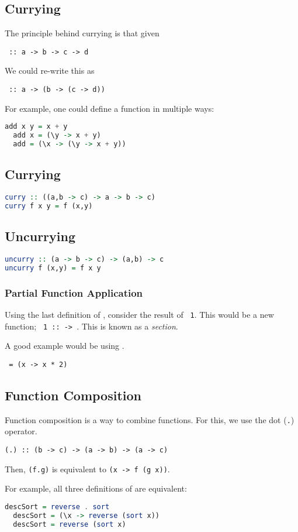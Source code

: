 \subsection{Currying}
The principle behind currying is that given
\begin{center}
  \texttt{ :: a -> b -> c -> d}
\end{center}
We could re-write this as
\begin{center}
  \texttt{ :: a -> (b -> (c -> d))}
\end{center}

For example, one could define a function \texttt{} in multiple ways:
\begin{lstlisting}[language=haskell]
  add x y = x + y
  add x = (\y -> x + y)
  add = (\x -> (\y -> x + y))
\end{lstlisting}

\subsection{Currying}
\begin{lstlisting}[language=haskell]
curry :: ((a,b -> c) -> a -> b -> c)
curry f x y = f (x,y)
\end{lstlisting}

\subsection{Uncurrying}
\begin{lstlisting}[language=haskell]
uncurry :: (a -> b -> c) -> (a,b) -> c
uncurry f (x,y) = f x y
\end{lstlisting}

\subsubsection{Partial Function Application}
Using the last definition of \texttt{}, consider the result of \texttt{ 1}. This would be a new function; \texttt{ 1 ::  -> }. This is known as a \textit{section}.

A good example would be using \texttt{}.
\begin{center}
  \texttt{ =  (x -> x * 2)}
\end{center}

\subsection{Function Composition}
Function composition is a way to combine functions. For this, we use the dot (\texttt{.}) operator.
\begin{center}
  \texttt{(.) :: (b -> c) -> (a -> b) -> (a -> c)}
\end{center}
Then, \texttt{(f.g)} is equivalent to \texttt{(x -> f (g x))}.

For example, all three definitions of \texttt{} are equivalent:
\begin{lstlisting}[language=haskell]
  descSort = reverse . sort
  descSort = (\x -> reverse (sort x))
  descSort = reverse (sort x)
\end{lstlisting}